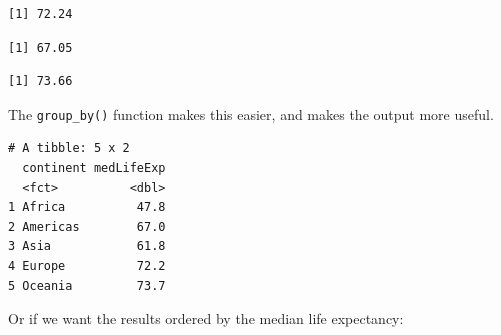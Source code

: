 \documentclass[]{krantz}
\makeatletter
\newenvironment{Shaded}{\begin{snugshade}}{\end{snugshade}}
\newcommand{\KeywordTok}[1]{\textcolor[rgb]{0.27,0.27,0.27}{\textbf{#1}}}
\newcommand{\DataTypeTok}[1]{\textcolor[rgb]{0.27,0.27,0.27}{#1}}
\newcommand{\StringTok}[1]{\textcolor[rgb]{0.5,0.5,0.5}{#1}}
\newcommand{\OperatorTok}[1]{\textcolor[rgb]{0.43,0.43,0.43}{\textbf{#1}}}
\newcommand{\NormalTok}[1]{#1}
\newenvironment{kframe}{%
\medskip{}
\setlength{\fboxsep}{.8em}
 \def\at@end@of@kframe{}%
 \ifinner\ifhmode%
  \def\at@end@of@kframe{\end{minipage}}%
  \begin{minipage}{\columnwidth}%
 \fi\fi%
 \def\FrameCommand##1{\hskip\@totalleftmargin \hskip-\fboxsep
 \colorbox{shadecolor}{##1}\hskip-\fboxsep
     \hskip-\linewidth \hskip-\@totalleftmargin \hskip\columnwidth}%
 \MakeFramed {\advance\hsize-\width
   \@totalleftmargin\z@ \linewidth\hsize
   \@setminipage}}%
 {\par\unskip\endMakeFramed%
 \at@end@of@kframe}
\renewenvironment{Shaded}{\begin{kframe}}{\end{kframe}}
\makeatother
\begin{document}
\begin{verbatim}
[1] 72.24
\end{verbatim}

\begin{Shaded}
\end{Shaded}

\begin{verbatim}
[1] 67.05
\end{verbatim}

\begin{Shaded}
\end{Shaded}

\begin{verbatim}
[1] 73.66
\end{verbatim}

The \texttt{group\_by()} function makes this easier, and makes the
output more useful.

\begin{Shaded}
\end{Shaded}

\begin{verbatim}
# A tibble: 5 x 2
  continent medLifeExp
  <fct>          <dbl>
1 Africa          47.8
2 Americas        67.0
3 Asia            61.8
4 Europe          72.2
5 Oceania         73.7
\end{verbatim}

Or if we want the results ordered by the median life expectancy:

\begin{Shaded}
\end{Shaded}
\end{document}
